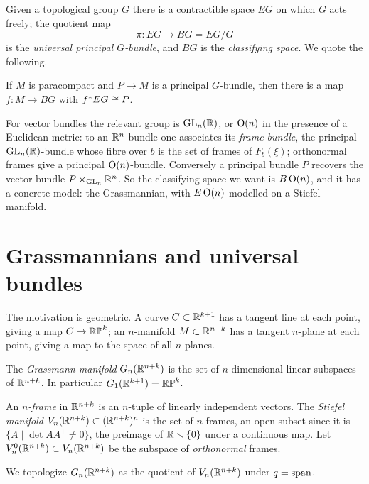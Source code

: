 Given a topological group $G$ there is a contractible space $EG$ on which $G$
acts freely; the quotient map
\[
\pi\colon EG\longrightarrow BG=EG/G
\]
is the \emph{universal principal $G$-bundle}, and $BG$ is the \emph{classifying
space}. We quote the following.

\begin{theorem}[quoted]
If $M$ is paracompact and $P\to M$ is a principal $G$-bundle, then there is a
map $f\colon M\to BG$ with $f^*EG\cong P$.
\end{theorem}

For vector bundles the relevant group is $\operatorname{GL}_n(\mathbb{R})$, or $\operatorname{O}(n)$ in the
presence of a Euclidean metric: to an $\mathbb{R}^n$-bundle one associates its
\emph{frame bundle}, the principal $\operatorname{GL}_n(\mathbb{R})$-bundle whose fibre over $b$ is
the set of frames of $F_b(\xi)$; orthonormal frames give a principal
$\operatorname{O}(n)$-bundle. Conversely a principal bundle $P$ recovers the vector bundle
$P\times_{\operatorname{GL}_n}\mathbb{R}^n$. So the classifying space we want is $B\operatorname{O}(n)$, and it has
a concrete model: the Grassmannian, with $E\operatorname{O}(n)$ modelled on a Stiefel
manifold.

\section{Grassmannians and universal bundles}

The motivation is geometric. A curve $C\subset\mathbb{R}^{k+1}$ has a tangent line at
each point, giving a map $C\to\mathbb{RP}^k$; an $n$-manifold $M\subset\mathbb{R}^{n+k}$ has a
tangent $n$-plane at each point, giving a map to the space of all $n$-planes.

\begin{definition}
The \emph{Grassmann manifold} $G_n(\mathbb{R}^{n+k})$ is the set of $n$-dimensional
linear subspaces of $\mathbb{R}^{n+k}$. In particular $G_1(\mathbb{R}^{k+1})=\mathbb{RP}^k$.
\end{definition}

\begin{definition}
An \emph{$n$-frame} in $\mathbb{R}^{n+k}$ is an $n$-tuple of linearly independent
vectors. The \emph{Stiefel manifold} $V_n(\mathbb{R}^{n+k})\subset(\mathbb{R}^{n+k})^n$ is the
set of $n$-frames, an open subset since it is
$\{A\mid\det AA^{\mathsf T}\neq0\}$, the preimage of $\mathbb{R}\smallsetminus\{0\}$
under a continuous map. Let $V_n^0(\mathbb{R}^{n+k})\subset V_n(\mathbb{R}^{n+k})$ be the
subspace of \emph{orthonormal} frames.
\end{definition}

We topologize $G_n(\mathbb{R}^{n+k})$ as the quotient of $V_n(\mathbb{R}^{n+k})$ under
$q=\operatorname{span}$.

